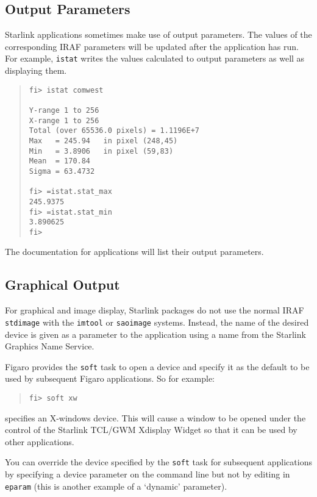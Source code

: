 \documentclass[twoside,11pt]{article}
\newcommand{\htmlref}[2]{#1}
\newcommand{\xref}[3]{#1}
\newcommand{\xlabel}[1]{}
\begin{document}
\subsection{\xlabel{output_parameters}Output Parameters}
Starlink applications sometimes make use of output parameters.
The values of the corresponding IRAF parameters will be updated after the
application has run. For example, \texttt{istat} writes the values calculated
to output parameters as well as displaying them.
\begin{quote} \begin{verbatim}
fi> istat comwest

Y-range 1 to 256
X-range 1 to 256
Total (over 65536.0 pixels) = 1.1196E+7
Max   = 245.94   in pixel (248,45)
Min   = 3.8906   in pixel (59,83)
Mean  = 170.84
Sigma = 63.4732

fi> =istat.stat_max
245.9375
fi> =istat.stat_min
3.890625
fi>
\end{verbatim} \end{quote}
The documentation for applications will list their output parameters.

\subsection{\xlabel{graphical_output}Graphical Output}
For graphical and image display, Starlink packages do not use the normal IRAF
\texttt{stdimage} with the \texttt{imtool} or \texttt{saoimage} systems.
Instead, the name of the desired device is given as a parameter to the
application using a name from the Starlink
\xref{Graphics Name Service}{sun57}{}.

Figaro provides the \texttt{soft} task to open a device and specify it as the
default to be used by subsequent Figaro applications. So for example:
\begin{quote} \begin{verbatim}
fi> soft xw
\end{verbatim} \end{quote}
specifies an X-windows device. This will cause a window to be opened under the
control of the Starlink
\xref{TCL/GWM Xdisplay Widget}{sun219}{}
so that it can be used by other applications.

You can override the device specified by the \texttt{soft} task for subsequent
applications by specifying a device parameter on the command line but not
by editing in \texttt{eparam} (this is another example of a
\htmlref{`dynamic'}{dynamic_parameters}
parameter).
\end{document}
